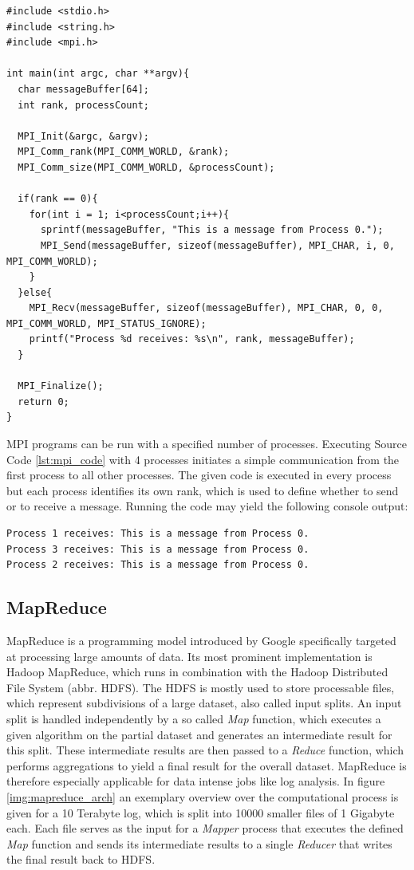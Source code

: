 \begin{lstlisting}[caption=MPI Code Example in C,captionpos=b,label=lst:mpi_code]
#include <stdio.h>
#include <string.h>
#include <mpi.h>

int main(int argc, char **argv){
  char messageBuffer[64];
  int rank, processCount;

  MPI_Init(&argc, &argv);
  MPI_Comm_rank(MPI_COMM_WORLD, &rank);
  MPI_Comm_size(MPI_COMM_WORLD, &processCount);

  if(rank == 0){
    for(int i = 1; i<processCount;i++){
      sprintf(messageBuffer, "This is a message from Process 0.");
      MPI_Send(messageBuffer, sizeof(messageBuffer), MPI_CHAR, i, 0, MPI_COMM_WORLD);
    }
  }else{
    MPI_Recv(messageBuffer, sizeof(messageBuffer), MPI_CHAR, 0, 0, MPI_COMM_WORLD, MPI_STATUS_IGNORE);
    printf("Process %d receives: %s\n", rank, messageBuffer);
  }

  MPI_Finalize();
  return 0;
}
\end{lstlisting}

MPI programs can be run with a specified number of processes. Executing Source Code \ref{lst:mpi_code} with 4 processes initiates a simple communication from the first process to all other processes. The given code is executed in every process but each process identifies its own rank, which is used to define whether to send or to receive a message. Running the code may yield the following console output:
\begin{Verbatim}[fontsize=\small]
Process 1 receives: This is a message from Process 0.
Process 3 receives: This is a message from Process 0.
Process 2 receives: This is a message from Process 0.
\end{Verbatim}

\subsection*{MapReduce}
MapReduce is a programming model introduced by Google specifically targeted at processing large amounts of data\cite{mapreduce}. Its most prominent implementation is Hadoop MapReduce, which runs in combination with the Hadoop Distributed File System (abbr. HDFS). The HDFS is mostly used to store processable files, which represent subdivisions of a large dataset, also called input splits. An input split is handled independently by a so called \textit{Map} function, which executes a given algorithm on the partial dataset and generates an intermediate result for this split. These intermediate results are then passed to a \textit{Reduce} function, which performs aggregations to yield a final result for the overall dataset. MapReduce is therefore especially applicable for data intense jobs like log analysis. In figure \ref{img:mapreduce_arch} an exemplary overview over the computational process is given for a 10 Terabyte log, which is split into 10000 smaller files of 1 Gigabyte each. Each file serves as the input for a \textit{Mapper} process that executes the defined \textit{Map} function and sends its intermediate results to a single \textit{Reducer} that writes the final result back to HDFS.

